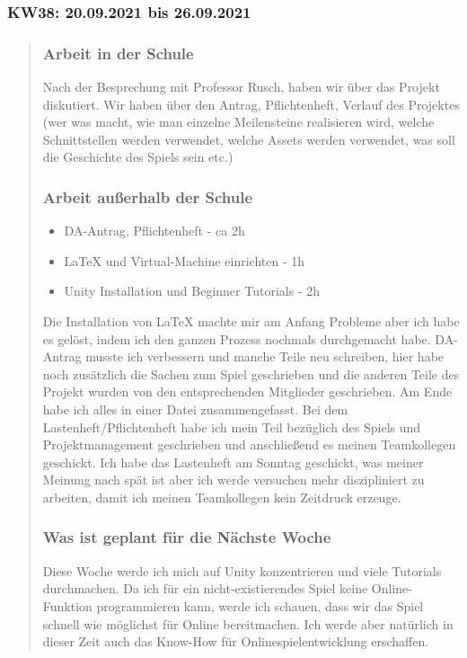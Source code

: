 
\subsubsection{KW38: 20.09.2021 bis 26.09.2021}
\begin{quote}
	\subsubsection*{Arbeit in der Schule}
	Nach der Besprechung mit Professor Rusch, haben wir über das Projekt diskutiert. Wir haben über den Antrag, Pflichtenheft, Verlauf des Projektes (wer was macht, wie man einzelne Meilensteine realisieren wird, welche Schnittstellen werden verwendet, welche Assets werden verwendet, was soll die Geschichte des Spiels sein etc.)
	
	\subsubsection*{Arbeit außerhalb der Schule}
	\begin{itemize}
		\item DA-Antrag, Pflichtenheft - ca 2h
		\item LaTeX und Virtual-Machine einrichten - 1h
		\item Unity Installation und Beginner Tutorials - 2h
	\end{itemize}
	Die Installation von LaTeX machte mir am Anfang Probleme aber ich habe es gelöst, indem ich den ganzen Prozess nochmals durchgemacht habe. DA-Antrag musste ich verbessern und manche Teile neu schreiben, hier habe noch zusätzlich die Sachen zum Spiel geschrieben und die anderen Teile des Projekt wurden von den entsprechenden Mitglieder geschrieben. Am Ende habe ich alles in einer Datei zusammengefasst. Bei dem Lastenheft/Pflichtenheft habe ich mein Teil bezüglich des Spiels und Projektmanagement geschrieben und anschließend es meinen Teamkollegen geschickt. Ich habe das Lastenheft am Sonntag geschickt, was meiner Meinung nach spät ist aber ich werde versuchen mehr diszipliniert zu arbeiten, damit ich meinen Teamkollegen kein Zeitdruck erzeuge.
	
	\subsubsection*{Was ist geplant für die Nächste Woche}
	Diese Woche werde ich mich auf Unity konzentrieren und viele Tutorials durchmachen. Da ich für ein nicht-existierendes Spiel keine Online-Funktion programmieren kann, werde ich schauen, dass wir das Spiel schnell wie möglichst für Online bereitmachen. Ich werde aber natürlich in dieser Zeit auch das Know-How für Onlinespielentwicklung erschaffen.
\end{quote}

